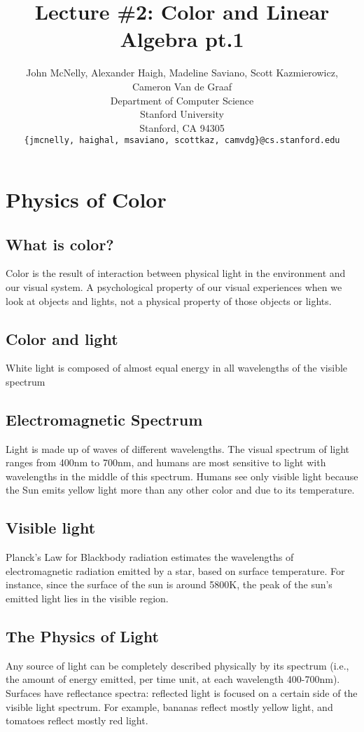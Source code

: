 \documentclass{article}
\title{Lecture \#2: Color and Linear Algebra pt.1}
\author{
  John McNelly, Alexander Haigh, Madeline Saviano, Scott Kazmierowicz, Cameron Van de Graaf \\
  Department of Computer Science\\
  Stanford University\\
  Stanford, CA 94305 \\
  \texttt{\{jmcnelly, haighal, msaviano, scottkaz, camvdg\}@cs.stanford.edu} \\
}
\begin{document}
\maketitle

\section{Physics of Color}
\subsection{What is color?}
Color is the result of interaction between physical light in the environment and our visual system.  A psychological property of our visual experiences when we look at objects and lights, not a physical property of those objects or lights.  ~\cite{palmer1999vision}


\subsection{Color and light}
White light is composed of almost equal energy in all wavelengths of the visible spectrum

\subsection{Electromagnetic Spectrum}
Light is made up of waves of different wavelengths.  The visual spectrum of light ranges from 400nm to 700nm, and humans are most sensitive to light with wavelengths in the middle of this spectrum.  Humans see only visible light because the Sun emits yellow light more than any other color and due to its temperature.

\subsection{Visible light}
Planck's Law for Blackbody radiation estimates the wavelengths of electromagnetic radiation emitted by a star, based on surface temperature.  For instance, since the surface of the sun is around 5800K, the peak of the sun's emitted light lies in the visible region.

\subsection{The Physics of Light}
Any source of light can be completely described physically by its spectrum (i.e., the amount of energy emitted, per time unit, at each wavelength 400-700nm).  Surfaces have reflectance spectra: reflected light is focused on a certain side of the visible light spectrum. For example, bananas reflect mostly yellow light, and tomatoes reflect mostly red light.
\end{document}
